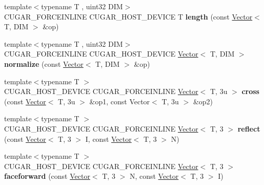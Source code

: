 \begin{DoxyCompactItemize}
\item 
\mbox{\label{namespacecugar_a5fb75bfae45376e0d847820c912035ef}} 
{\footnotesize template$<$typename T , uint32 D\+IM$>$ }\\C\+U\+G\+A\+R\+\_\+\+F\+O\+R\+C\+E\+I\+N\+L\+I\+NE C\+U\+G\+A\+R\+\_\+\+H\+O\+S\+T\+\_\+\+D\+E\+V\+I\+CE T {\bfseries length} (const \hyperlink{structcugar_1_1_vector}{Vector}$<$ T, D\+IM $>$ \&op)
\item 
\mbox{\label{namespacecugar_a3a8ad8d63e4d97b1c55711878fb0af70}} 
{\footnotesize template$<$typename T , uint32 D\+IM$>$ }\\C\+U\+G\+A\+R\+\_\+\+F\+O\+R\+C\+E\+I\+N\+L\+I\+NE C\+U\+G\+A\+R\+\_\+\+H\+O\+S\+T\+\_\+\+D\+E\+V\+I\+CE \hyperlink{structcugar_1_1_vector}{Vector}$<$ T, D\+IM $>$ {\bfseries normalize} (const \hyperlink{structcugar_1_1_vector}{Vector}$<$ T, D\+IM $>$ \&op)
\item 
\mbox{\label{namespacecugar_a112488b730ad0e8010eccab3e140578a}} 
{\footnotesize template$<$typename T $>$ }\\C\+U\+G\+A\+R\+\_\+\+H\+O\+S\+T\+\_\+\+D\+E\+V\+I\+CE C\+U\+G\+A\+R\+\_\+\+F\+O\+R\+C\+E\+I\+N\+L\+I\+NE \hyperlink{structcugar_1_1_vector}{Vector}$<$ T, 3u $>$ {\bfseries cross} (const \hyperlink{structcugar_1_1_vector}{Vector}$<$ T, 3u $>$ \&op1, const Vector$<$ T, 3u $>$ \&op2)
\item 
\mbox{\label{namespacecugar_a4654da1735595b560455e76dab8fb68a}} 
{\footnotesize template$<$typename T $>$ }\\C\+U\+G\+A\+R\+\_\+\+H\+O\+S\+T\+\_\+\+D\+E\+V\+I\+CE C\+U\+G\+A\+R\+\_\+\+F\+O\+R\+C\+E\+I\+N\+L\+I\+NE \hyperlink{structcugar_1_1_vector}{Vector}$<$ T, 3 $>$ {\bfseries reflect} (const \hyperlink{structcugar_1_1_vector}{Vector}$<$ T, 3 $>$ I, const \hyperlink{structcugar_1_1_vector}{Vector}$<$ T, 3 $>$ N)
\item 
\mbox{\label{namespacecugar_a8be215ee476f2176cbe524c710b80ed5}} 
{\footnotesize template$<$typename T $>$ }\\C\+U\+G\+A\+R\+\_\+\+H\+O\+S\+T\+\_\+\+D\+E\+V\+I\+CE C\+U\+G\+A\+R\+\_\+\+F\+O\+R\+C\+E\+I\+N\+L\+I\+NE \hyperlink{structcugar_1_1_vector}{Vector}$<$ T, 3 $>$ {\bfseries faceforward} (const \hyperlink{structcugar_1_1_vector}{Vector}$<$ T, 3 $>$ N, const \hyperlink{structcugar_1_1_vector}{Vector}$<$ T, 3 $>$ I)

\end{DoxyCompactItemize}
